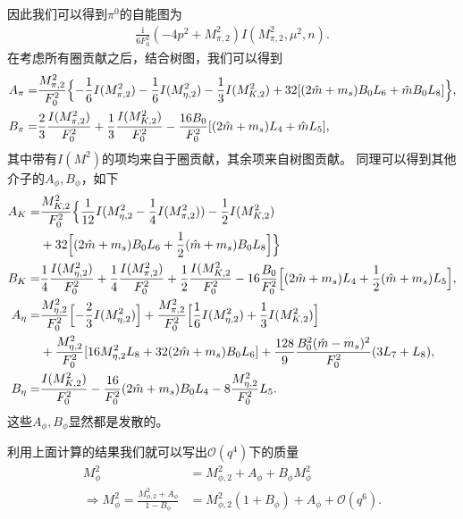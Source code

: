 \documentclass[aps,tightenlines,16pt]{ctexart}
\numberwithin{equation}{section}
\begin{document}
因此我们可以得到$\pi^0$的自能图为
\begin{align}
   \frac{\mbox{i}}{6F_0^2}(-4p^2+M_{\pi,2}^2) I(M_{\pi,2}^2,\mu^2,n).
\end{align}
在考虑所有圈贡献之后，结合树图，我们可以得到
\begin{align}
   \begin{aligned}
      A_{\pi} = &\frac{M_{\pi,2}^2}{F_0^2}\Bigl\{-\frac{1}{6}I(M_{\pi,2}^2)-\frac{1}{6}I(M_{\eta,2}^2)-\frac{1}{3}I(M_{K,2}^2)+32[(2\hat{m}+m_s)B_0L_6+\hat{m}B_0L_8]\Bigr\},\\
      B_{\pi} = &\frac{2}{3}\frac{I(M_{\pi,2}^2)}{F_0^2}+\frac{1}{3}\frac{I(M_{K,2}^2)}{F_0^2}-\frac{16B_0}{F_0^2}[(2\hat{m}+m_s)L_4+\hat{m}L_5],
   \end{aligned}
\end{align}
其中带有$I(M^2)$的项均来自于圈贡献，其余项来自树图贡献。
同理可以得到其他介子的$A_{\phi},B_{\phi}$，如下
\begin{align}
   \begin{aligned}
      A_K=&\frac{M_{K,2}^2}{F_0^2}\Bigl\{\frac{1}{12}I(M_{\eta,2}^2-\frac{1}{4}I(M_{\pi,2}^2))-\frac{1}{2}I(M_{K,2}^2)  \\    
      & +32\Bigl[(2\hat{m}+m_s)B_0L_6+\frac{1}{2}(\hat{m}+m_s)B_0L_8\Bigr]\Bigr\}\\
      B_K=&\frac{1}{4}\frac{I(M_{\eta,2}^2)}{F_0^2}+\frac{1}{4}\frac{I(M_{\pi,2}^2)}{F_0^2}+\frac{1}{2}\frac{I(M_{K,2}^2}{F_0^2} -16\frac{B_0}{F_0^2}\Bigl[(2\hat{m}+m_s)L_4+\frac{1}{2}(\hat{m}+m_s)L_5\Bigr],\\
      A_{\eta} = &\frac{M_{\eta,2}^2}{F_0^2}\Bigl[-\frac{2}{3}I(M_{\eta,2}^2)\Bigr]+\frac{M_{\pi,2}^2}{F_0^2}\Bigl[\frac{1}{6}I(M_{\eta,2}^2)+\frac{1}{3}I(M_{K,2}^2)\Bigr]\\
      &+\frac{M_{\eta,2}^2}{F_0^2}[16M_{\eta,2}^2L_8+32(2\hat{m}+m_s)B_0L_6]+\frac{128}{9}\frac{B_0^2(\hat{m}-m_s)^2}{F_0^2}(3L_7+L_8),\\
      B_{\eta}=&\frac{I(M_{K,2}^2)}{F_0^2}-\frac{16}{F_0^2}(2\hat{m}+m_s)B_0L_4-8\frac{M_{\eta,2}^2}{F_0^2}L_5.
      \end{aligned}
\end{align}
这些$A_{\phi},B_{\phi}$显然都是发散的。

利用上面计算的结果我们就可以写出$\mathcal{O}(q^4)$下的质量
\begin{align}
   M_{\phi}^2 &= M_{\phi,2}^2 + A_{\phi} + B_{\phi}M_{\phi}^2\\
   \Rightarrow M_{\phi}^2 = \frac{M_{\phi,2}^2+A_{\phi}}{1-B_{\phi}}&=M_{\phi,2}^2(1+B_{\phi})+A_{\phi}+\mathcal{O}(q^6).
\end{align}
\end{document}
